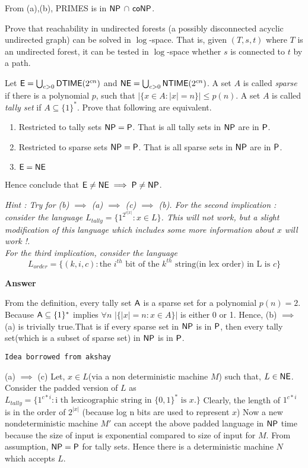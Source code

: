 \documentclass[addpoints,12pt]{exam}
\begin{document}
\begin{questions}
From (a),(b), PRIMES is in $\NP$ $\cap$ $\co\NP$.

\question[10] Prove that reachability in undirected forests (a possibly disconnected acyclic undirected graph) can be solved in $\log$-space. That is, given $(T,s,t)$ where $T$ is an undirected forest, it can be tested in $\log$-space whether $s$ is connected to $t$ by a path.

\question[18]
Let $\E = \bigcup_{c > 0} \DTIME(2^{cn})$ and $\NE = \bigcup_{c > 0} \NTIME(2^{cn})$. A set $A$ is called {\em sparse} if there is a polynomial $p$,
    such that $|\{ x \in A : |x| = n \}| \le p(n)$. A set $A$ is called
    {\em tally set} if $A \subseteq \{1\}^*$.  Prove that following
    are equivalent.
  \begin{enumerate}
  \item Restricted to tally sets $\NP = \P$. That is all tally sets in $\NP$ are in $\P$.
  \item Restricted to sparse sets $\NP = \P$. That is all sparse sets
    in $\NP$ are in $\P$.
  \item $\E = \NE$
  \end{enumerate}
  Hence conclude that $\E \ne \NE \implies \P \ne \NP$.
  
  \emph{Hint : Try for (b) $\implies$ (a) $\implies$ (c) $\implies$ (b). 
  For the second implication : consider the language $L_{tally} = \{1^{2^{c|x|}} : x \in L\}$.
  This will not work, but a slight modification of this language which includes some more information about 
  $x$ will work !. \\ For the third implication, consider the language 
\[ L_{order} = \{(k,i,c): \textrm{the $i^{th}$ bit of the $k^{th}$ string(in lex order) in L is $c$} \} \] }


\textbf{Answer}\newline

From the definition, every tally set $\A$ is a sparse set for a polynomial $p(n)=2$. Because $\A \subseteq \{1\}^{\ast}$ implies $\forall n$ $|\{|x|=n:x \in A\}|$ is either 0 or 1.\newline
Hence, (b) $\implies$ (a) is trivially true.That is if every sparse set in $\NP$ is in $\P$, then every tally set(which is a subset of sparse set) in $\NP$ is in $\P$.	
\newline

\begin{verbatim}
Idea borrowed from akshay
\end{verbatim}

(a) $\implies$ (c) \newline
Let, $x \in L$(via a non deterministic machine $M$) such that, $L \in \NE$. Consider the padded version of $L$ as $L_{tally} = \{1^{c \ast i}:\text{i th lexicographic string in $\{0,1\}^{\ast}$ is $x$}.\}$
\newline
Clearly, the length of $1^{c \ast i}$ is in the order of $2^{|x|}$ (because log n bits are used to represent $x$)
Now a new nondeterministic machine $M'$ can accept the above padded language in $\NP$ time because the size of input is exponential compared to size of input for $M$.
From assumption, $\NP = \P$ for tally sets. Hence there is a deterministic machine $N$ which accepts $L$.


\end{questions}
\end{document}
